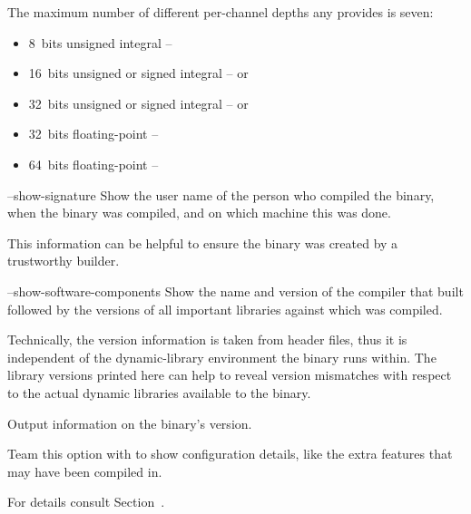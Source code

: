 \begin{codelist}
  The maximum number of different per-channel depths any \appcmd{}
  provides is seven:
  \begin{itemize}
  \item 8~bits unsigned integral -- 
  \item 16~bits unsigned or signed integral --  or 
  \item 32~bits unsigned or signed integral --  or 
  \item 32~bits floating-point -- 
  \item 64~bits floating-point -- 
  \end{itemize}


  \label{opt:show-signature}%
\item[--show-signature]\itemend Show the user name of the person who
  compiled the binary, when the binary was compiled, and on which
  machine this was done.

  This information can be helpful to ensure the binary was created by a
  trustworthy builder.


  \label{opt:show-software-components}%
\item[--show-software-components]\itemend Show the name and version of
  the compiler that built \App{} followed by the versions of all
  important libraries against which \App{} was
  compiled.%

  Technically, the version information is taken from header files, thus
  it is independent of the dynamic-library environment the binary runs
  within.  The library versions printed here can help to reveal version
  mismatches with respect to the actual dynamic libraries available to
  the binary.


  \label{opt:version}%
\item[\itempar{-V \\ --version}]\itemend Output information on the
  binary's version.%

  Team this option with  to show configuration
  details, like the extra features that may have been compiled in.

  For details consult Section~.
\end{codelist}

